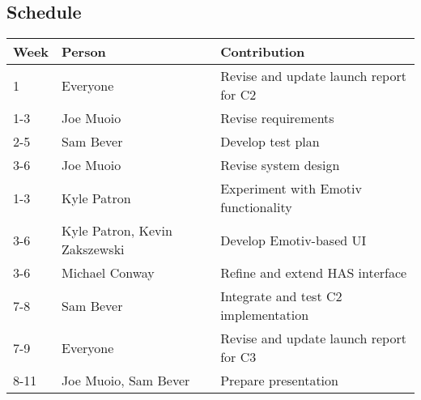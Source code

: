 \documentclass{report}
\begin{document}
\subsection*{Schedule}

\begin{tabular}{| l | l | l |}
    \hline
    Week & Person & Contribution \\
    \hline \hline

    1 & Everyone & Revise and update launch report for C2 \\ \hline
    1-3 & Joe Muoio & Revise requirements \\ \hline
    2-5 & Sam Bever & Develop test plan \\ \hline
    3-6 & Joe Muoio& Revise system design \\ \hline
    1-3 & Kyle Patron & Experiment with Emotiv functionality \\ \hline
    3-6 & Kyle Patron, Kevin Zakszewski & Develop Emotiv-based UI \\ \hline
    3-6 & Michael Conway & Refine and extend HAS interface \\ \hline
    7-8 & Sam Bever & Integrate and test C2 implementation \\ \hline
    7-9 & Everyone & Revise and update launch report for C3 \\ \hline
    8-11 & Joe Muoio, Sam Bever & Prepare presentation \\ \hline

\end{tabular}
\end{document}
